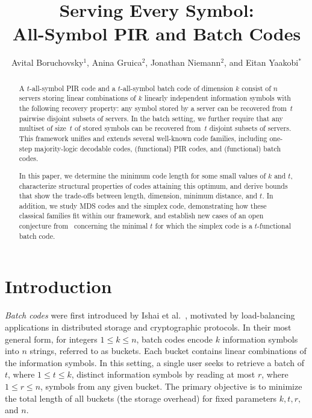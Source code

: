 \documentclass[11pt,a4paper]{article}
\title{\textbf{Serving Every Symbol: \\ All-Symbol PIR and Batch Codes}}
\author{Avital Boruchovsky$^1$, Anina Gruica$^2$, Jonathan Niemann$^2$, and Eitan Yaakobi$^*$}
\affil{$^1$Technion -- Israel Institute of Technology, Israel \\
$^2$Technical University of Denmark, Denmark \\
\vspace{0.5cm}
\small{\texttt{avital.bor@campus.technion.ac.il, \{anigr, jtni\}@dtu.dk, yaakobi@cs.technion.ac.il}}}
\theoremstyle{definition}
\begin{document}
\maketitle



\begin{abstract}
A $t$-all-symbol PIR code and a $t$-all-symbol batch code of dimension $k$ consist of $n$ servers storing linear combinations of $k$ linearly independent information symbols with the following recovery property: any symbol stored by a server can be recovered from~$t$ pairwise disjoint subsets of servers. In the batch setting, we further require that any multiset of size~$t$ of stored symbols can be recovered from~$t$ disjoint subsets of servers. This framework unifies and extends several well-known code families, including one-step majority-logic decodable codes, (functional) PIR codes, and (functional) batch codes.

In this paper, we determine the minimum code length for some small values of $k$ and $t$, characterize structural properties of codes attaining this optimum, and derive bounds that show the trade-offs between length, dimension, minimum distance, and $t$. In addition, we study MDS codes and the simplex code, demonstrating how these classical families fit within our framework, and establish new cases of an open conjecture from~\cite{YAAKOBI2020} concerning the minimal $t$ for which the simplex code is a $t$-functional batch code.
\end{abstract}
\renewcommand{\baselinestretch}{1}\normalsize
\section{Introduction}


\emph{Batch codes} were first introduced by Ishai et al.~\cite{IKOS04}, motivated by load-balancing applications in distributed storage and cryptographic protocols. In their most general form, for integers $1 \le k \le n$, batch codes encode $k$ information symbols into $n$ strings, referred to as buckets. Each bucket contains linear combinations of the information symbols. In this setting, a single user seeks to retrieve a batch of $t$, where $1\le t \le k$, distinct information symbols by reading at most $r$, where $1\le r \le n$, symbols from any given bucket. The primary objective is to minimize the total length of all buckets (the storage overhead) for fixed parameters $k, t, r,$ and $n$.
\end{document}
